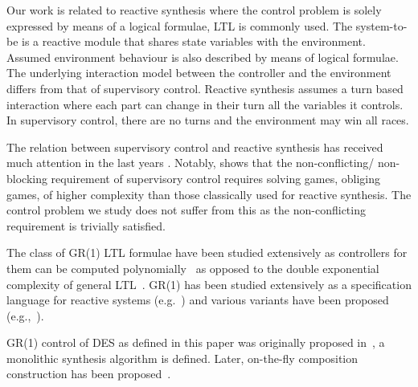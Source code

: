 
Our work is related to reactive synthesis where the control problem is solely expressed by means of a logical formulae, LTL is commonly used. The system-to-be is a reactive module that shares state variables with the environment. Assumed environment behaviour is also described by means of logical formulae. The underlying interaction model between the controller and the environment differs from that of supervisory control. Reactive synthesis assumes a turn based interaction where each part can change in their turn all the variables it controls. In supervisory control, there are no turns and the environment may win all races. 


The relation between supervisory control and reactive synthesis has received much attention in the last years \cite{ehlers_supervisory_nodate}. Notably, \cite{majumdar_supervisory_2021} shows that the non-conflicting/ non-blocking  requirement of supervisory control requires solving games, obliging games, of higher complexity than those classically used for reactive synthesis. The control problem we study does not suffer from this as the non-conflicting requirement is trivially satisfied. 




The class of GR(1) LTL formulae have been studied extensively as controllers for them can be computed polynomially~\cite{Piterman:2006:SRD} as opposed to the double exponential complexity of general LTL~\cite{pnueli_synthesis}. GR(1) has been studied extensively as a specification language for reactive systems (e.g.~\cite{menghi_specification_2019, DBLP:journals/tse/MenghiTAPVCG23}) and various variants have been proposed (e.g.,~\cite{majumdar_environmentally-friendly_2019}). 

 GR(1) control of DES as defined in this paper was originally proposed in~\cite{DIppolito2008}, a monolithic synthesis algorithm is defined. 
Later, on-the-fly composition construction has been proposed~\cite{Ciolek2020,DBLP:conf/aips/DelgadoSBU23}.  

